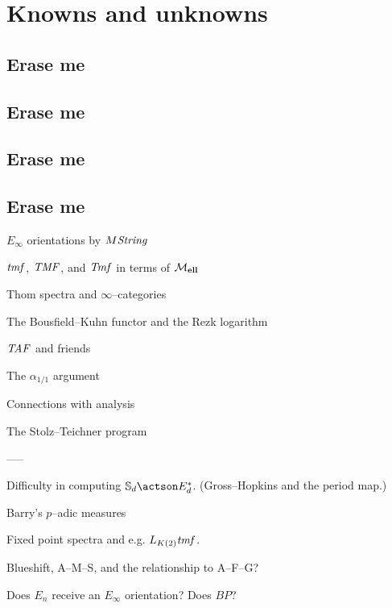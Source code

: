 
\chapter{Knowns and unknowns}

\section{Erase me}

\section{Erase me}

\section{Erase me}

\section{Erase me}


$E_\infty$ orientations by $M\mathit{String}$

$\mathit{tmf}$, $\mathit{TMF}$, and $\mathit{Tmf}$ in terms of $\mathcal{M}_{\mathbf{ell}}$

Thom spectra and $\infty$--categories

The Bousfield--Kuhn functor and the Rezk logarithm



$\mathit{TAF}$ and friends

The $\alpha_{1/1}$ argument




Connections with analysis

The Stolz--Teichner program






-----

Difficulty in computing $\S_d \actson E_d^*$. (Gross--Hopkins and the period map.)

Barry's $p$--adic measures

Fixed point spectra and e.g. $L_{K(2)} \mathit{tmf}$.

Blueshift, A--M--S, and the relationship to A--F--G?

Does $E_n$ receive an $E_\infty$ orientation?  Does $BP$?

